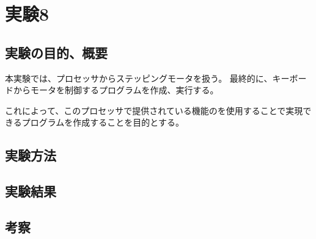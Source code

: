 \section{実験8}
\subsection{実験の目的、概要}
本実験では、プロセッサからステッピングモータを扱う。
最終的に、キーボードからモータを制御するプログラムを作成、実行する。

これによって、このプロセッサで提供されている機能のを使用することで実現できるプログラムを作成することを目的とする。

\subsection{実験方法}

\subsection{実験結果}

\subsection{考察}
